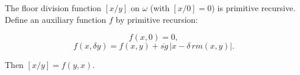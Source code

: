 The floor division function $[x/y]$ on $\omega$ (with $[x/0] = 0$) is primitive recursive. Define an auxiliary function $f$ by primitive recursion:

$$f(x, 0) = 0,$$
$$f(x, \delta y) = f(x, y) + \overline{sg}\,|x - \delta\, rm(x, y)|.$$

Then $[x/y] = f(y, x)$.
